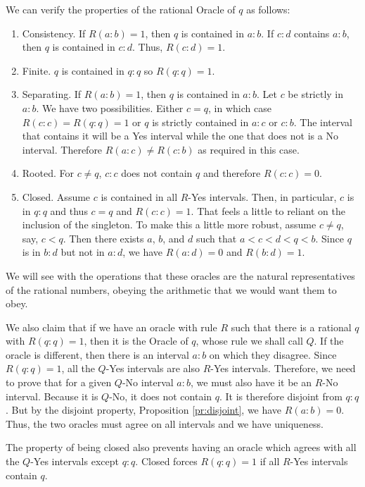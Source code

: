 \documentclass[12pt]{article}
\theoremstyle{remark}
\begin{document}
We can verify the properties of the rational Oracle of $q$ as follows: 

\begin{enumerate}
    \item Consistency. If $R(a:b)=1$, then $q$ is contained in $a:b$. If $c:d$ contains $a:b$, then $q$ is contained in $c:d$. Thus, $R(c:d)=1$.
    \item Finite. $q$ is contained in $q:q$ so $R(q:q)=1$.
    \item Separating. If $R(a:b) =1$, then $q$ is contained in $a:b$. Let $c$ be strictly in $a:b$. We have two possibilities. Either $c = q$, in which case $R(c:c)=R(q:q)=1$ or $q$ is strictly contained in $a:c$ or $c:b$. The interval that contains it will be a Yes interval while the one that does not is a No interval. Therefore $R(a:c) \neq R(c:b)$ as required in this case. 
    \item Rooted. For $c \neq q$, $c:c$ does not contain $q$ and therefore $R(c:c)=0$.
    \item Closed. Assume $c$ is contained in all $R$-Yes intervals. Then, in particular, $c$ is in $q:q$ and thus $c=q$ and $R(c:c)=1$. That feels a little to reliant on the inclusion of the singleton. To make this a little more robust, assume $c \neq q$, say, $c < q$. Then there exists $a$, $b$, and $d$ such that $a < c < d < q < b$. Since $q$ is in $b:d$ but not in $a:d$, we have $R(a:d)=0$ and $R(b:d)=1$. 
\end{enumerate}

We will see with the operations that these oracles are the natural representatives of the rational numbers, obeying the arithmetic that we would want them to obey.  

We also claim that if we have an oracle with rule $R$ such that there is a rational $q$ with $R(q:q)=1$, then it is the Oracle of $q$, whose rule we shall call $Q$. If the oracle is different, then there is an interval $a:b$ on which they disagree. Since $R(q:q) =1$, all the  $Q$-Yes intervals are also $R$-Yes intervals. Therefore, we need to prove that for a given  $Q$-No interval $a:b$, we must also have it be an $R$-No interval. Because it is $Q$-No, it does not contain $q$. It is therefore disjoint from $q:q$. But by the disjoint property, Proposition \ref{pr:disjoint}, we have $R(a:b)=0$. Thus, the two oracles must agree on all intervals and we have uniqueness. 

The property of being closed also prevents having an oracle which agrees with all the $Q$-Yes intervals except $q:q$. Closed forces $R(q:q)=1$ if all $R$-Yes intervals contain $q$.
\end{document}
